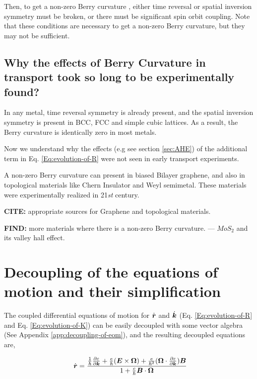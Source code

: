 \documentclass{report}
\renewcommand\vec[1]{\ensuremath\boldsymbol{#1}} %
\begin{document}
Then, to get a non-zero Berry curvature \cite{ralph2020berry}, either time reversal or spatial inversion symmetry must be broken, or there must be significant spin orbit coupling. Note that these conditions are necessary to get a non-zero Berry curvature, but they may not be sufficient.

\subsection{Why the effects of Berry Curvature in transport took so long to be experimentally found?}
 In any metal, time reversal symmetry is already present, and the spatial inversion symmetry is present in BCC, FCC and simple cubic lattices. As a result, the Berry curvature is identically zero in most metals.
 
 Now we understand why the effects (e.g see section \ref{sec:AHE}) of the additional term in Eq. \eqref{Eq:evolution-of-R} were not seen in early transport experiments.
 
 A non-zero Berry curvature can present in biased Bilayer graphene, and also in topological materials like Chern Insulator and Weyl semimetal. These materials were experimentally realized in 21\textit{st} century.
 
 \textbf{CITE:} appropriate sources for Graphene and topological materials.
 
 \textbf{FIND:} more materials where there is a non-zero Berry curvature. --- $MoS_2$ and its valley hall effect.

\section{Decoupling of the equations of motion and their simplification}

The coupled differential equations of motion for $\dot{\vec{r}}$ and $\dot{\vec{k}}$ (Eq. \eqref{Eq:evolution-of-R} and Eq. \eqref{Eq:evolution-of-K}) can be easily decoupled with some vector algebra (See Appendix \ref{app:decoupling-of-eom}), and the resulting decoupled equations are,

\begin{equation}~\label{Eq:SC_EOM_r_dot}
	\dot{\vec{r}} = \frac{\frac{1}{\hbar} \frac{\partial \varepsilon}{\partial \vec{k}} + \frac{e}{\hbar} (\vec{E}\times\vec{\Omega}) + \frac{e}{\hbar^2} (\vec{\Omega} \cdot \frac{\partial \varepsilon}{\partial \vec{k}} )\vec{B}}{1 + \frac{e}{\hbar} \vec{B}\cdot\vec{\Omega}}
\end{equation}
\end{document}
